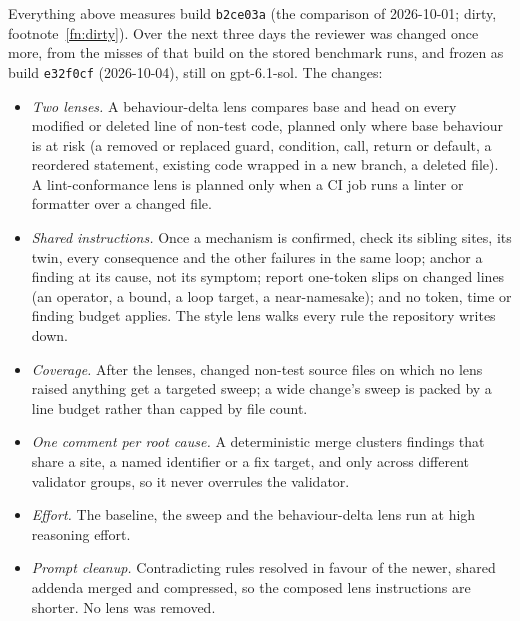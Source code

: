 \documentclass[11pt,a4paper]{article}
\newcommand{\code}[1]{\texttt{#1}}
\begin{document}
Everything above measures build \code{b2ce03a} (the comparison of
2026-10-01; dirty, footnote~\ref{fn:dirty}). Over the next
three days the reviewer was changed once more, from the misses of that build
on the stored benchmark runs, and frozen as build \code{e32f0cf}
(2026-10-04), still on gpt-6.1-sol. The changes:
\begin{itemize}
  \item \emph{Two lenses.} A behaviour-delta lens compares base and head on
  every modified or deleted line of non-test code, planned only where base
  behaviour is at risk (a removed or replaced guard, condition, call,
  return or default, a reordered statement, existing code wrapped in a new
  branch, a deleted file). A lint-conformance lens is planned only when a CI
  job runs a linter or formatter over a changed file.
  \item \emph{Shared instructions.} Once a mechanism is confirmed, check its
  sibling sites, its twin, every consequence and the other failures in the
  same loop; anchor a finding at its cause, not its symptom; report one-token
  slips on changed lines (an operator, a bound, a loop target, a
  near-namesake); and no token, time or finding budget applies. The style
  lens walks every rule the repository writes down.
  \item \emph{Coverage.} After the lenses, changed non-test source files on
  which no lens raised anything get a targeted sweep; a wide change's sweep
  is packed by a line budget rather than capped by file count.
  \item \emph{One comment per root cause.} A deterministic merge clusters
  findings that share a site, a named identifier or a fix target, and only
  across different validator groups, so it never overrules the validator.
  \item \emph{Effort.} The baseline, the sweep and the behaviour-delta lens
  run at high reasoning effort.
  \item \emph{Prompt cleanup.} Contradicting rules resolved in favour of the
  newer, shared addenda merged and compressed, so the composed lens
  instructions are shorter. No lens was removed.
\end{itemize}
\end{document}
